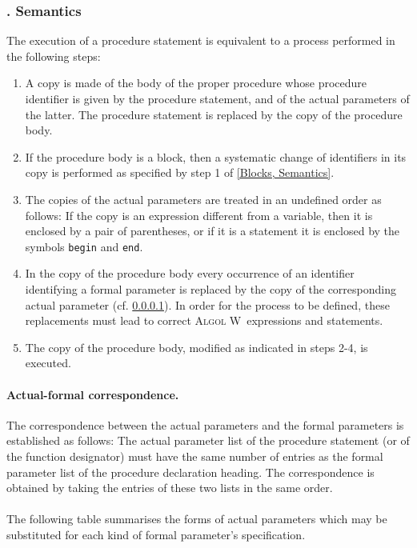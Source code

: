 \documentclass[a4paper]{article}
\def\ALGOLW{\textsc{Algol W}}
\def\quietsubsubsection#1{\addtocounter{subsubsection}{1}\subsubsection*{\thesubsubsection. #1}}
\def\Semantics{\quietsubsubsection{Semantics}}
\def\R#1{\lstinline[language=AlgolW,style=ReferenceManual]{#1}}
\begin{document}
\Semantics
\label{Procedure Statements, Semantics}

The execution of a procedure statement is equivalent to a process
performed in the following steps:

\begin{enumerate}[{Step} 1.]
\item A copy is made of the body of the proper procedure whose
  procedure identifier is given by the procedure statement, and of the
  actual parameters of the latter. The procedure statement is replaced
  by the copy of the procedure body.
\item If the procedure body is a block, then a systematic change of
  identifiers in its copy is performed as specified by step 1 of
  \ref{Blocks, Semantics}.
\item The copies of the actual parameters are treated in an undefined
  order as follows: If the copy is an expression
  different from a variable, then it is enclosed by a pair of
  parentheses, or if it is a statement it is enclosed by the symbols
  \R{begin} and \R{end}.
\item In the copy of the procedure body every occurrence of an
  identifier identifying a formal parameter is replaced by the copy of
  the corresponding actual parameter (cf. \ref{Procedure Statements, Semantics, Actual-formal correspondence}). 
  In order for the
  process to be defined, these replacements must lead to correct \ALGOLW\ 
  expressions and statements.
\item The copy of the procedure body, modified as indicated in steps
  2-4, is executed.
\end{enumerate}

\setcounter{paragraph}{0}

\paragraph{Actual-formal correspondence.}

\label{Procedure Statements, Semantics, Actual-formal correspondence}
The correspondence between the actual parameters and the formal
parameters is established as follows: The actual parameter list of the
procedure statement (or of the function designator) must have the same
number of entries as the formal parameter list of the procedure
declaration heading. The correspondence is obtained by taking the
entries of these two lists in the same order.

\paragraph{} The following table summarises the forms of actual
parameters which may be substituted for each kind of formal
parameter's specification.
\end{document}
